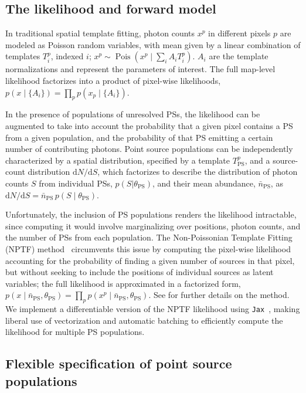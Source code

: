 \documentclass[prd,aps,10pt,nofootinbib,twocolumn,superscriptaddress,preprintnumbers,balancelastpage,longbibliography,floatfix]{revtex4-2}
\begin{document}
\subsection{The likelihood and forward model}
    
In traditional spatial template fitting, photon counts $x^p$ in different pixels $p$ are modeled as Poisson random variables, with mean given by a linear combination of templates $T_i^p$, indexed $i$; $x^p \sim \operatorname{Pois}\left(x^p \mid \sum_i A_i T_i^p\right)$. $A_i$ are the template normalizations and represent the parameters of interest. The full map-level likelihood factorizes into a product of pixel-wise likelihoods, $p(x \mid \{A_i\})= \prod_p p(x_p \mid \{A_i\})$.

In the presence of populations of unresolved PSs, the likelihood can be augmented to take into account the probability that a given pixel contains a PS from a given population, and the probability of that PS emitting a certain number of contributing photons. Point source populations can be independently characterized by a spatial distribution, specified by a template $T_{\mathrm{PS}}^p$, and a source-count distribution ${\mathrm{d} N} / {\mathrm{d} S}$, which factorizes to describe the distribution of photon counts $S$ from individual PSs, $p(S | \theta_\mathrm{PS})$, and their mean abundance, $\bar n_\mathrm{PS}$, as ${\mathrm{d} N} / {\mathrm{d} S}=\bar n_\mathrm{PS} \, p(S \mid \theta_{\mathrm{PS}})$. 

Unfortunately, the inclusion of PS populations renders the likelihood intractable, since computing it would involve marginalizing over positions, photon counts, and the number of PSs from each population. The Non-Poissonian Template Fitting (NPTF) method~\cite{Lee:2014mza,Lee:2015fea} circumvents this issue by computing the pixel-wise likelihood accounting for the probability of finding a given number of sources in that pixel, but without seeking to include the positions of individual sources as latent variables; the full likelihood is approximated in a factorized form, $p\left(x \mid \bar n_\mathrm{PS}, \theta_{\mathrm{PS}}\right)=\prod_p p\left(x^p \mid \bar n_\mathrm{PS}, \theta_{\mathrm{PS}}\right)$. See \citet{Mishra-Sharma:2016gis} for further details on the method. We implement a differentiable version of the NPTF likelihood using \texttt{Jax}~\cite{jax2018github}, making liberal use of vectorization and automatic batching to efficiently compute the likelihood for multiple PS populations.

\subsection{Flexible specification of point source populations}
\end{document}
